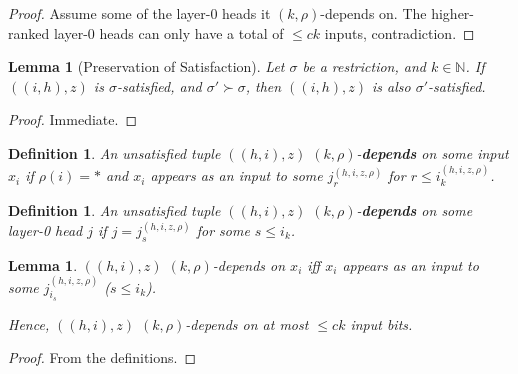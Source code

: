 \documentclass[11pt,letterpaper]{article}
\newcommand{\key}[1]{\textbf{#1}}
\newcounter{theorem}
\newtheorem{defin}[theorem]{Definition}
\newtheorem{lemma}[theorem]{Lemma}
\begin{document}
\begin{proof}
Assume some of the layer-0 heads it $(k,\rho)$-depends on.
The higher-ranked layer-0 heads can only have a total of $\leq ck$ inputs, contradiction.
\end{proof}



\begin{lemma}[Preservation of Satisfaction]\label{lemma:satisfied-preserved}
Let $\sigma$ be a restriction, and $k \in \mathbb{N}$.
If $((i,h),z)$ is $\sigma$-satisfied, and $\sigma' \succ \sigma$, then $((i,h),z)$ is also $\sigma'$-satisfied.
\end{lemma}

\begin{proof}
Immediate.
\end{proof}



\begin{defin}
An unsatisfied tuple $((h,i),z)$ $(k,\rho)$-\textbf{depends} on some input $x_i$ if $\rho(i) = *$ and $x_i$ appears as an input to some $j_r^{(h,i,z,\rho)}$ for $r \leq i_k^{(h,i,z,\rho)}$.
\end{defin}

\begin{defin}
An unsatisfied tuple $((h,i),z)$ $(k,\rho)$-\textbf{depends} on some layer-0 head $j$ if $j = j^{(h,i,z,\rho)}_s$ for some $s \leq i_k$.
\end{defin}

\begin{lemma}\label{lemma:depend-bits-count}
 $((h,i),z)$ $(k,\rho)$-{depends} on $x_i$ iff $x_i$ appears as an input to some $j^{(h,i,z,\rho)}_{i_s}$ ($s \leq i_k$).
 
  Hence, $((h,i),z)$ $(k,\rho)$-{depends} on at most $\leq ck$ input bits.
\end{lemma}
\begin{proof}
From the definitions.
\end{proof}
\end{document}
